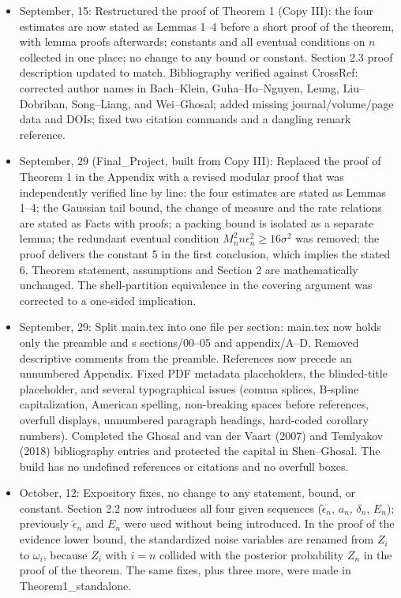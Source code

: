 \documentclass[11pt]{article}
\begin{document}
\begin{itemize}
    \item September, 15: Restructured the proof of Theorem 1 (Copy III): the four estimates are now stated as Lemmas 1--4 before a short proof of the theorem, with lemma proofs afterwards; constants and all eventual conditions on $n$ collected in one place; no change to any bound or constant. Section 2.3 proof description updated to match. Bibliography verified against CrossRef: corrected author names in Bach--Klein, Guha--Ho--Nguyen, Leung, Liu--Dobriban, Song--Liang, and Wei--Ghosal; added missing journal/volume/page data and DOIs; fixed two citation commands and a dangling remark reference.

    \item September, 29 (Final\_Project, built from Copy III): Replaced the proof of Theorem 1 in the Appendix with a revised modular proof that was independently verified line by line: the four estimates are stated as Lemmas 1--4; the Gaussian tail bound, the change of measure and the rate relations are stated as Facts with proofs; a packing bound is isolated as a separate lemma; the redundant eventual condition $M_n^2n\epsilon_n^2\geq16\sigma^2$ was removed; the proof delivers the constant 5 in the first conclusion, which implies the stated 6. Theorem statement, assumptions and Section 2 are mathematically unchanged. The shell-partition equivalence in the covering argument was corrected to a one-sided implication.

    \item September, 29: Split main.tex into one file per section: main.tex now holds only the preamble and \verb||s sections/00--05 and appendix/A--D. Removed descriptive comments from the preamble. References now precede an unnumbered Appendix. Fixed PDF metadata placeholders, the blinded-title placeholder, and several typographical issues (comma splices, B-spline capitalization, American spelling, non-breaking spaces before references, overfull displays, unnumbered paragraph headings, hard-coded corollary numbers). Completed the Ghosal and van der Vaart (2007) and Temlyakov (2018) bibliography entries and protected the capital in Shen--Ghosal. The build has no undefined references or citations and no overfull boxes.

    \item October, 12: Expository fixes, no change to any statement, bound, or constant. Section 2.2 now introduces all four given sequences ($\widetilde\epsilon_n$, $a_n$, $\delta_n$, $E_n$); previously $\widetilde\epsilon_n$ and $E_n$ were used without being introduced. In the proof of the evidence lower bound, the standardized noise variables are renamed from $Z_i$ to $\omega_i$, because $Z_i$ with $i=n$ collided with the posterior probability $Z_n$ in the proof of the theorem. The same fixes, plus three more, were made in Theorem1\_standalone.


\end{itemize}
\end{document}
